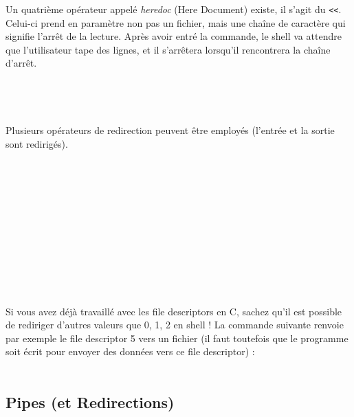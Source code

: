 \bigskip

Un quatrième opérateur appelé \textit{heredoc} (Here Document) existe, il s'agit du \texttt{<{}<}.
Celui-ci prend en paramètre non pas un fichier, mais une chaîne de caractère qui signifie l'arrêt de la lecture.
Après avoir entré la commande, le shell va attendre que l'utilisateur tape des lignes, et il s'arrêtera lorsqu'il rencontrera la chaîne d'arrêt.\\

\\
\\
\\
\\

Plusieurs opérateurs de redirection peuvent être employés (l'entrée et la sortie sont redirigés).\\

\\
\\
\\
\\
\\

\bigskip

\\
\\
\\
\\
\\

\bigskip

Si vous avez déjà travaillé avec les file descriptors en C, sachez qu'il est possible de rediriger d'autres valeurs que 0, 1, 2 en shell !
La commande suivante renvoie par exemple le file descriptor 5 vers un fichier (il faut toutefois que le programme soit écrit pour envoyer des données vers ce file descriptor) :\\

\\


\newpage
\subsection{Pipes (et Redirections)}

\bigskip

